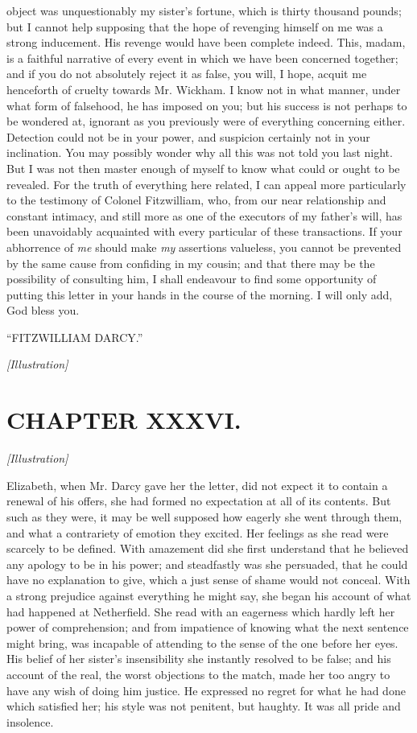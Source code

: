 \documentclass[12pt]{book}
\begin{document}
object was unquestionably my sister's fortune, which is thirty thousand pounds; but I cannot help supposing that the hope of revenging himself on me was a strong inducement. His revenge would have been complete indeed. This, madam, is a faithful narrative of every event in which we have been concerned together; and if you do not absolutely reject it as false, you will, I hope, acquit me henceforth of cruelty towards Mr. Wickham. I know not in what manner, under what form of falsehood, he has imposed on you; but his success is not perhaps to be wondered at, ignorant as you previously were of everything concerning either. Detection could not be in your power, and suspicion certainly not in your inclination. You may possibly wonder why all this was not told you last night. But I was not then master enough of myself to know what could or ought to be revealed. For the truth of everything here related, I can appeal more particularly to the testimony of Colonel Fitzwilliam, who, from our near relationship and constant intimacy, and still more as one of the executors of my father's will, has been unavoidably acquainted with every particular of these transactions. If your abhorrence of \textit{me} should make \textit{my} assertions valueless, you cannot be prevented by the same cause from confiding in my cousin; and that there may be the possibility of consulting him, I shall endeavour to find some opportunity of putting this letter in your hands in the course of the morning. I will only add, God bless you.

``FITZWILLIAM DARCY.''

\emph{[Illustration]}

\chapter{CHAPTER XXXVI.}

\emph{[Illustration]}

Elizabeth, when Mr. Darcy gave her the letter, did not expect it to contain a renewal of his offers, she had formed no expectation at all of its contents. But such as they were, it may be well supposed how eagerly she went through them, and what a contrariety of emotion they excited. Her feelings as she read were scarcely to be defined. With amazement did she first understand that he believed any apology to be in his power; and steadfastly was she persuaded, that he could have no explanation to give, which a just sense of shame would not conceal. With a strong prejudice against everything he might say, she began his account of what had happened at Netherfield. She read with an eagerness which hardly left her power of comprehension; and from impatience of knowing what the next sentence might bring, was incapable of attending to the sense of the one before her eyes. His belief of her sister's insensibility she instantly resolved to be false; and his account of the real, the worst objections to the match, made her too angry to have any wish of doing him justice. He expressed no regret for what he had done which satisfied her; his style was not penitent, but haughty. It was all pride and insolence.
\end{document}
